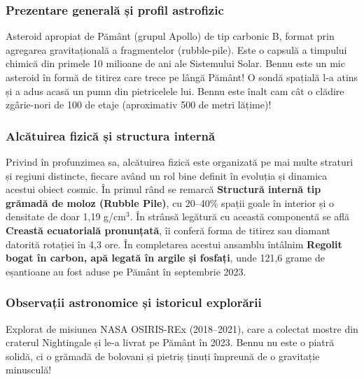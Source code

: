 \subsubsection*{Prezentare generală și profil astrofizic}
Asteroid apropiat de Pământ (grupul Apollo) de tip carbonic B, format prin agregarea gravitațională a fragmentelor (\guillemotleft{}rubble-pile\guillemotright{}). Este o capsulă a timpului chimică din primele 10 milioane de ani ale Sistemului Solar. Bennu este un mic asteroid în formă de titirez care trece pe lângă Pământ! O sondă spațială l-a atins și a adus acasă un pumn din pietricelele lui. Bennu este înalt cam cât o clădire zgârie-nori de 100 de etaje (aproximativ 500 de metri lățime)!

\subsubsection*{Alcătuirea fizică și structura internă}
Privind în profunzimea sa, alcătuirea fizică este organizată pe mai multe straturi și regiuni distincte, fiecare având un rol bine definit în evoluția și dinamica acestui obiect cosmic. În primul rând se remarcă \textbf{Structură internă tip \guillemotleft{}grămadă de moloz\guillemotright{} (Rubble Pile)}, cu 20--40\% spații goale în interior și o densitate de doar 1,19 g/cm$^3$. În strânsă legătură cu această componentă se află \textbf{Creastă ecuatorială pronunțată}, îi conferă forma de titirez sau diamant datorită rotației în 4,3 ore. În completarea acestui ansamblu întâlnim \textbf{Regolit bogat în carbon, apă legată în argile și fosfați}, unde 121,6 grame de eșantioane au fost aduse pe Pământ în septembrie 2023.

\subsubsection*{Observații astronomice și istoricul explorării}
Explorat de misiunea NASA OSIRIS-REx (2018--2021), care a colectat mostre din craterul Nightingale și le-a livrat pe Pământ în 2023. Bennu nu este o piatră solidă, ci o grămadă de bolovani și pietriș ținuți împreună de o gravitație minusculă!

